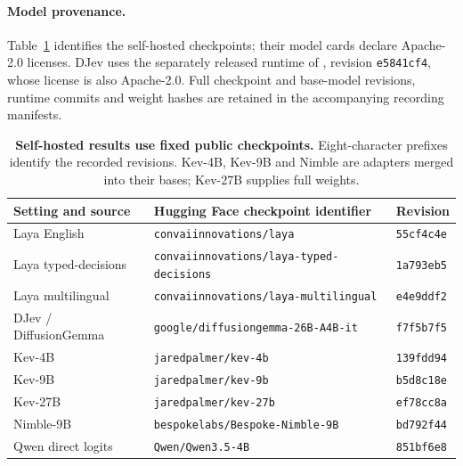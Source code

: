 \paragraph{Model provenance.}
Table~\ref{tab:model-provenance} identifies the self-hosted checkpoints; their model cards declare Apache-2.0 licenses.
DJev uses the separately released runtime of \citet{mastracci2026djev}, revision \texttt{e5841cf4}, whose license is also Apache-2.0.
Full checkpoint and base-model revisions, runtime commits and weight hashes are retained in the accompanying recording manifests.

\begin{table}[t]
  \centering
  \small
  \begin{tabular}{@{}>{\raggedright\arraybackslash}p{}>{\raggedright\arraybackslash}p{}l@{}}
    \toprule
    Setting and source & Hugging Face checkpoint identifier & Revision \\
    \midrule
    Laya English \citep{convai2026laya} & \texttt{convaiinnovations/laya} & \texttt{55cf4c4e} \\
    Laya typed-decisions & \texttt{convaiinnovations/laya-typed-decisions} & \texttt{1a793eb5} \\
    Laya multilingual & \texttt{convaiinnovations/laya-multilingual} & \texttt{e4e9ddf2} \\
    \midrule
    DJev / DiffusionGemma \citep{google2026diffusiongemma} & \texttt{google/diffusiongemma-26B-A4B-it} & \texttt{f7f5b7f5} \\
    \midrule
    Kev-4B \citep{palmer2026kev} & \texttt{jaredpalmer/kev-4b} & \texttt{139fdd94} \\
    Kev-9B & \texttt{jaredpalmer/kev-9b} & \texttt{b5d8c18e} \\
    Kev-27B & \texttt{jaredpalmer/kev-27b} & \texttt{ef78cc8a} \\
    \midrule
    Nimble-9B \citep{bespoke2026nimble} & \texttt{bespokelabs/Bespoke-Nimble-9B} & \texttt{bd792f44} \\
    Qwen direct logits \citep{qwen2026qwen35} & \texttt{Qwen/Qwen3.5-4B} & \texttt{851bf6e8} \\
    \bottomrule
  \end{tabular}
  \caption{\textbf{Self-hosted results use fixed public checkpoints.}
  Eight-character prefixes identify the recorded revisions. Kev-4B, Kev-9B and Nimble are adapters merged into their bases; Kev-27B supplies full weights.}
  \label{tab:model-provenance}
\end{table}
